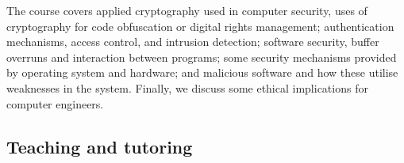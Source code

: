 
The course covers
applied cryptography used in computer security, \eg uses of cryptography for 
code obfuscation or digital rights management;
authentication mechanisms, access control, and intrusion detection;
software security, \eg buffer overruns and interaction between programs;
some security mechanisms provided by operating system and hardware;
and malicious software and how these utilise weaknesses in the system.
Finally, we discuss some ethical implications for computer engineers.

\subsection{Teaching and tutoring}

